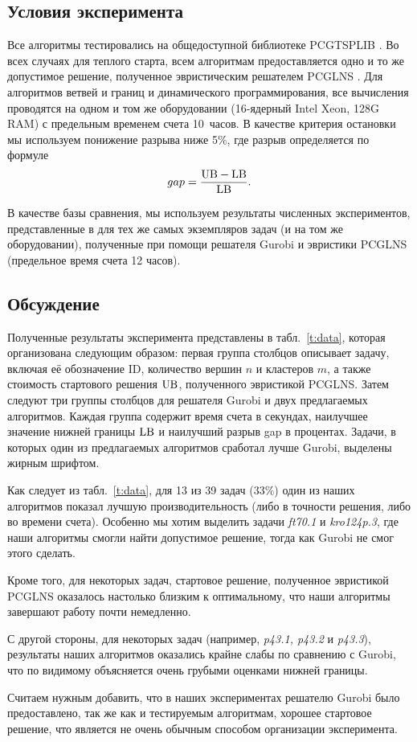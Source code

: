 \subsection{Условия эксперимента}
Все алгоритмы тестировались на общедоступной библиотеке
PCGTSPLIB
\cite{SALMAN2020163}. 
Во всех случаях для теплого старта,
всем алгоритмам предоставляется одно и то же
допустимое решение,
полученное эвристическим решателем
PCGLNS
\cite{PCGLNS}. 
Для алгоритмов ветвей и границ и динамического программирования,
все вычисления проводятся на одном и том же оборудовании
(16-ядерный Intel Xeon, 128G RAM)
с предельным временем счета 10~часов.
В качестве критерия остановки 
мы используем понижение разрыва ниже 5\%,
где разрыв определяется по формуле
$$
gap = \frac{\mathrm{UB} - \mathrm{LB}}{\mathrm{LB}}.
$$

В качестве базы сравнения,
мы используем результаты численных экспериментов,
представленные в 
\cite{KKP-optima2020}
для тех же самых экземпляров задач
(и на том же оборудовании),
полученные при помощи решателя Gurobi и
эвристики PCGLNS
(предельное время счета 12 часов).

\subsection{Обсуждение}

Полученные результаты эксперимента
представлены в табл.~\ref{t:data},
которая организована следующим образом:
первая группа столбцов описывает
задачу,
включая её обозначение ID,
количество вершин $n$
и кластеров $m$,
а также стоимость стартового решения $\mathrm{UB}$,
полученного эвристикой PCGLNS.
Затем следуют три группы столбцов
для решателя Gurobi
и двух предлагаемых алгоритмов.
Каждая группа содержит время
счета в секундах,
наилучшее значение нижней границы
$\mathrm{LB}$
и наилучший разрыв gap
в процентах.
Задачи,
в которых один из предлагаемых
алгоритмов сработал лучше Gurobi,
выделены жирным шрифтом.

Как следует из табл.~\ref{t:data},
для 13 из 39 задач (33\%)
один из наших алгоритмов
показал лучшую производительность
(либо в точности решения, либо во времени счета).
Особенно мы хотим выделить задачи
{\it ft70.1} и {\it kro124p.3},
где наши алгоритмы смогли найти допустимое решение,
тогда как Gurobi не смог этого сделать.

Кроме того,
для некоторых задач,
стартовое решение,
полученное эвристикой PCGLNS
оказалось настолько близким к оптимальному,
что наши алгоритмы завершают работу
почти немедленно.

С другой стороны,
для некоторых задач
(например, {\it p43.1, p43.2} и {\it p43.3}),
результаты наших алгоритмов
оказались крайне слабы по сравнению с Gurobi,
что по видимому объясняется
очень грубыми оценками нижней границы.

Считаем нужным добавить,
что в наших экспериментах
решателю Gurobi было предоставлено,
так же как и тестируемым алгоритмам,
хорошее стартовое решение,
что является не очень обычным способом
организации эксперимента.

